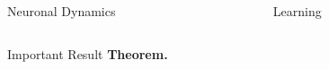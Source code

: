 \documentclass[final]{beamer}
\newlength{\onecolwid}
\newlength{\twocolwid}
\begin{document}
\begin{frame}[t]
\begin{columns}[t]
\begin{column}{\twocolwid}
\begin{columns}[t,totalwidth=\twocolwid]
\begin{column}{\onecolwid}
\begin{block}{Neuronal Dynamics}
\end{block}


\end{column} %

\begin{column}{\onecolwid}\vspace{-.6in} %


\begin{block}{Learning}

\end{block}


\end{column} %

\end{columns} %


\begin{alertblock}{Important Result}
\textbf{Theorem.}

\end{alertblock} 


\begin{columns}[t,totalwidth=\twocolwid] %

\begin{column}{\onecolwid} %



\end{column}
\end{columns}
\end{column}
\end{columns}
\end{frame}
\end{document}
